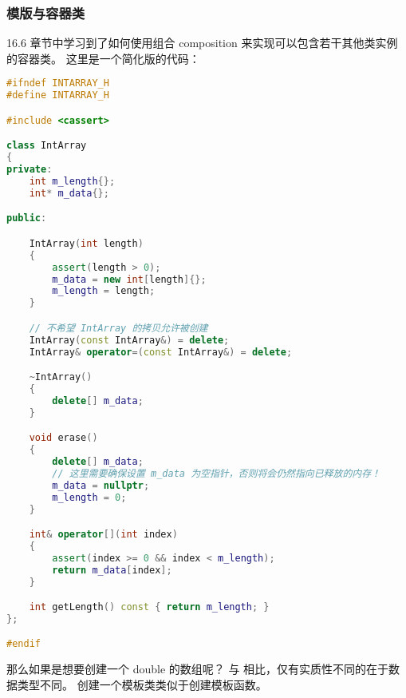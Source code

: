 \documentclass[../../LearnCpp.tex]{subfiles}
\begin{document}

\subsubsection*{模版与容器类}

16.6 章节中学习到了如何使用组合 composition 来实现可以包含若干其他类实例的容器类。
这里是一个简化版的代码：

\begin{lstlisting}[language=C++]
#ifndef INTARRAY_H
#define INTARRAY_H

#include <cassert>

class IntArray
{
private:
    int m_length{};
    int* m_data{};

public:

    IntArray(int length)
    {
        assert(length > 0);
        m_data = new int[length]{};
        m_length = length;
    }

    // 不希望 IntArray 的拷贝允许被创建
    IntArray(const IntArray&) = delete;
    IntArray& operator=(const IntArray&) = delete;

    ~IntArray()
    {
        delete[] m_data;
    }

    void erase()
    {
        delete[] m_data;
        // 这里需要确保设置 m_data 为空指针，否则将会仍然指向已释放的内存！
        m_data = nullptr;
        m_length = 0;
    }

    int& operator[](int index)
    {
        assert(index >= 0 && index < m_length);
        return m_data[index];
    }

    int getLength() const { return m_length; }
};

#endif
\end{lstlisting}

那么如果是想要创建一个 double 的数组呢？
与  相比，仅有实质性不同的在于数据类型不同。
创建一个模板类类似于创建模板函数。
\end{document}

